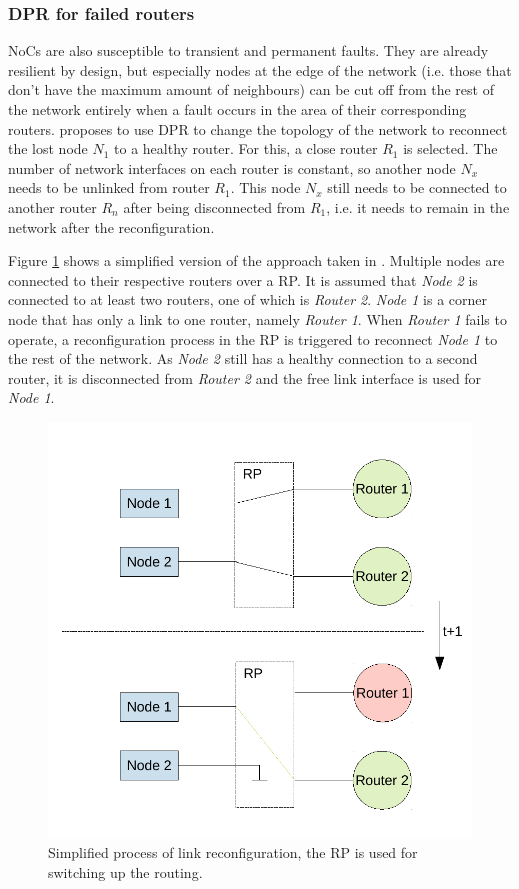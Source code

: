 \subsubsection{\gls{DPR} for failed routers}\label{sec:failedRouters}
\glspl{NoC} are also susceptible to transient and permanent faults. 
They are already resilient by design, but especially nodes at the edge of the network (i.e. those that don't have the maximum amount of neighbours) can be cut off from the rest of the network entirely when a fault occurs in the area of their corresponding routers. 
\cite{wehbe_secure_2016} proposes to use \gls{DPR} to change the topology of the network to reconnect the lost node $N_1$ to a healthy router.
For this, a close router $R_1$ is selected. 
The number of network interfaces on each router is constant, so another node $N_x$ needs to be unlinked from router $R_1$. 
This node $N_x$ still needs to be connected to another router $R_n$ after being disconnected from $R_1$, i.e. it needs to remain in the network after the reconfiguration.

Figure \ref{fig:nocSwap} shows a simplified version of the approach taken in \cite{wehbe_secure_2016}. 
Multiple nodes are connected to their respective routers over a \gls{RP}.
It is assumed that \textit{Node 2} is connected to at least two routers, one of which is \textit{Router 2}.
\textit{Node 1} is a corner node that has only a link to one router, namely \textit{Router 1}.
When \textit{Router 1} fails to operate, a reconfiguration process in the \gls{RP} is triggered to reconnect \textit{Node 1} to the rest of the network.
As \textit{Node 2} still has a healthy connection to a second router, it is disconnected from \textit{Router 2} and the free link interface is used for \textit{Node 1}.
\begin{figure}
    \centering
    \includegraphics[width=\columnwidth]{graphics/nocSwap.pdf}
    \caption{Simplified process of link reconfiguration, the \gls{RP} is used for switching up the routing.}\label{fig:nocSwap}
\end{figure}
